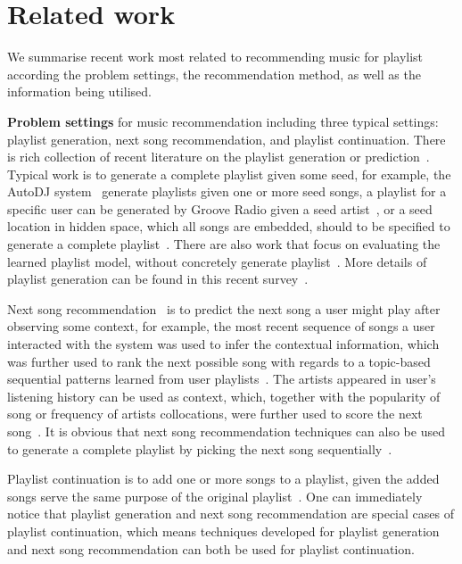 \section{Related work}
\label{sec:related}

We summarise recent work most related to recommending music for playlist
according the problem settings, the recommendation method,
as well as the information being utilised.


{\bf Problem settings} for music recommendation including three typical settings:
playlist generation, next song recommendation, and playlist continuation.
%
There is rich collection of recent literature on the playlist generation 
or prediction~\cite{platt2002learning,mcfee2011natural,mcfee2012hypergraph,chen2012playlist,ben2017groove}.
%
Typical work is to generate a complete playlist given some seed,
for example, the AutoDJ system~\cite{platt2002learning} generate playlists given one or more seed songs,
a playlist for a specific user can be generated by Groove Radio given a seed artist~\cite{ben2017groove},
or a seed location in hidden space, which all songs are embedded, 
should to be specified to generate a complete playlist~\cite{chen2012playlist}.
%
There are also work that focus on evaluating the learned playlist model, 
without concretely generate playlist~\cite{mcfee2011natural,mcfee2012hypergraph}.
More details of playlist generation can be found in this recent survey~\cite{bonnin2015automated}.


Next song recommendation~\cite{hariri2012context,bonnin2013evaluating,jannach2015beyond}
is to predict the next song a user might play after observing some context,
for example, the most recent sequence of songs a user interacted with the system was used to 
infer the contextual information, which was further used to rank the next possible song 
with regards to a topic-based sequential patterns learned from user playlists~\cite{hariri2012context}.
%
The artists appeared in user's listening history can be used as context, 
which, together with the popularity of song or frequency of artists collocations,
were further used to score the next song~\cite{mcfee2012million,bonnin2013evaluating}.
%
It is obvious that next song recommendation techniques can also be used to generate a 
complete playlist by picking the next song sequentially~\cite{bonnin2013evaluating,ben2017groove}.


Playlist continuation is to add one or more songs to a playlist, 
given the added songs serve the same purpose of the original playlist~\cite{schedl2017,recsysch2018}.
One can immediately notice that playlist generation and next song recommendation are special cases
of playlist continuation, which means techniques developed for playlist generation and 
next song recommendation can both be used for playlist continuation.


